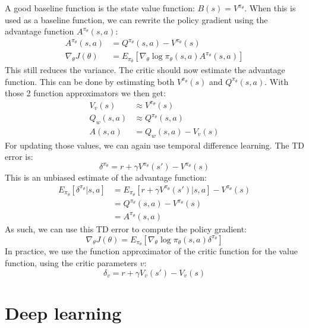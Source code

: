 \documentclass[a4paper]{article}
\begin{document}
A good baseline function is the state value function: $B(s) = V^{\pi_{\theta}}$. When this is used as a baseline function, we can rewrite the policy gradient using the advantage function $A^{\pi_{\theta}}(s,a)$:
\begin{align}
A^{\pi_{\theta}}(s,a) &= Q^{\pi_{\theta}}(s,a) - V^{\pi_{\theta}}(s)\\
\nabla_{\theta}J(\theta) &= E_{\pi_{\theta}}[\nabla_{\theta} \log \pi_{\theta}(s,a) A^{\pi_{\theta}}(s,a)]
\end{align}
This still reduces the variance. The critic should now estimate the advantage function. This can be done by estimating both $V^{\pi_{\theta}}(s)$ and $Q^{\pi_{\theta}}(s,a)$. With those 2 function approximators we then get:
\begin{align}
V_v(s) &\approx V^{\pi_{\theta}}(s)\\
Q_w(s,a) &\approx Q^{\pi_{\theta}}(s,a)\\
A(s,a) &= Q_w(s,a) - V_v(s)
\end{align}
For updating those values, we can again use temporal difference learning. The TD error is:
\begin{equation}
\delta^{\pi_{\theta}} = r + \gamma V^{\pi_{\theta}}(s') - V^{\pi_{\theta}}(s)
\end{equation}
This is an unbiased estimate of the advantage function:
\begin{align}
E_{\pi_{\theta}}[\delta^{\pi_{\theta}} | s,a] &= E_{\pi_{\theta}}[r + \gamma V^{\pi_{\theta}}(s') | s,a] - V^{\pi_{\theta}}(s)\\
&= Q^{\pi_{\theta}}(s,a) - V^{\pi_{\theta}}(s)\\
&= A^{\pi_{\theta}}(s,a)
\end{align}
As such, we can use this TD error to compute the policy gradient:
\begin{equation}
\nabla_{\theta}J(\theta) = E_{\pi_{\theta}}[\nabla_{\theta} \log \pi_{\theta}(s,a) \delta^{\pi_{\theta}}]
\end{equation}
In practice, we use the function approximator of the critic function for the value function, using the critic parameters $v$:
\begin{equation}
\delta_v = r + \gamma V_v(s') - V_v(s)
\end{equation}

\section{Deep learning}
\end{document}
